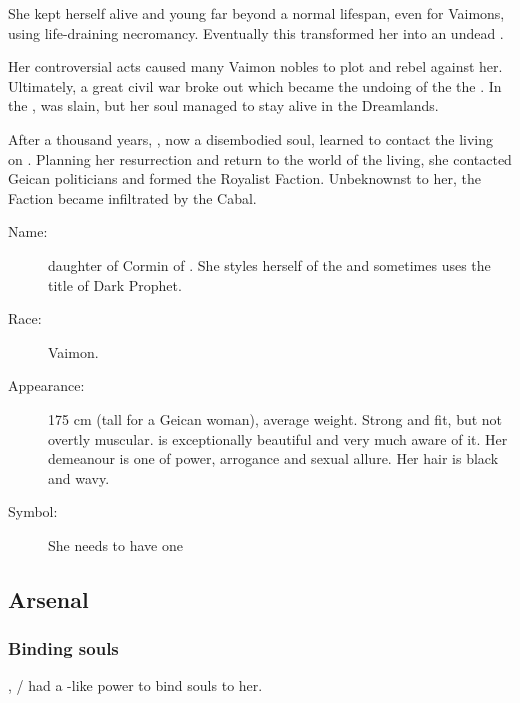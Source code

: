 She kept herself alive and young far beyond a normal lifespan, even for Vaimons, using life-draining necromancy. Eventually this transformed her into an undead \Reaver. 

Her controversial acts caused many Vaimon nobles to plot and rebel against her. Ultimately, a great civil war broke out which became the undoing of the \VaimonCaliphate\dash the \darkfall. In the \darkfall{}, \Belzir{} was slain, but her soul managed to stay alive in the Dreamlands. 

After a thousand years, \Belzir{}, now a disembodied soul, learned to  contact the living on \Miith{}. Planning her resurrection and return to the world of the living, she contacted Geican politicians and formed the Royalist Faction. Unbeknownst to her, the Faction became infiltrated by the Cabal. 

\begin{description}
  \item[Name:] {\Belzir} daughter of {Cormin} of \ClanGeican. She styles herself \Calipha of the \VaimonCaliphate and sometimes uses the title of Dark Prophet. 
  \item[Race:] Vaimon. 
  \item[Appearance:] 175 cm (tall for a Geican woman), average weight. Strong and fit, but not overtly muscular. \Belzir{} is exceptionally beautiful and very much aware of it. Her demeanour is one of power, arrogance and sexual allure. Her hair is black and wavy. 
  \item[Symbol:] She needs to have one\prikker 
\end{description}









\subsection{Arsenal}





\subsubsection{Binding souls}
\index{\carcer!\Belzir}
, \Shiaraid{}/\Belzir{} had a \sephirah-like power to bind souls to her. 

